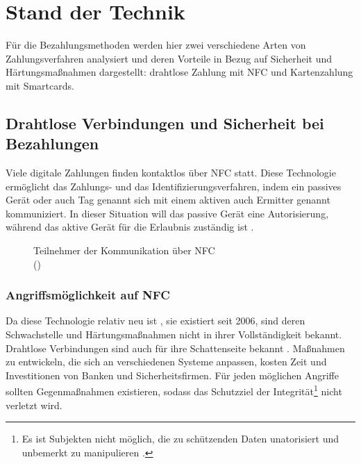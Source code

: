 \section{Stand der Technik}

Für die Bezahlungsmethoden werden hier zwei verschiedene Arten von Zahlungsverfahren analysiert und deren
Vorteile in Bezug auf Sicherheit und Härtungsmaßnahmen dargestellt: drahtlose Zahlung mit NFC und 
Kartenzahlung mit Smartcards.

\subsection{Drahtlose Verbindungen und Sicherheit bei Bezahlungen}

Viele digitale Zahlungen finden kontaktlos über NFC statt. Diese Technologie ermöglicht das Zahlungs- und
das Identifizierungsverfahren, indem ein passives Gerät oder auch Tag genannt sich mit einem aktiven 
auch Ermitter genannt kommuniziert. In dieser Situation will das passive Gerät eine Autorisierung,
während das aktive Gerät für die Erlaubnis zuständig ist \cite{refart:NFNK}. 

\begin{figure}[H]
   \caption{Teilnehmer der Kommunikation über NFC\\(\cite{refart:GPIN})}
   \label{fig:refart_GPIN}
\end{figure}


\subsubsection{Angriffsmöglichkeit auf NFC}

Da diese Technologie relativ neu ist \cite{refip:NTAS}, sie existiert seit 2006, sind deren Schwachstelle 
und Härtungsmaßnahmen nicht in ihrer Vollständigkeit bekannt. Drahtlose Verbindungen sind auch für ihre Schattenseite 
bekannt \cite{refip:NYRS}. Maßnahmen zu entwickeln, die sich an verschiedenen Systeme anpassen, kosten Zeit 
und Investitionen von Banken und Sicherheitsfirmen. Für jeden möglichen Angriffe sollten Gegenmaßnahmen existieren, 
sodass das Schutzziel der Integrität\footnote{Es ist Subjekten nicht möglich, die zu schützenden Daten unatorisiert und 
unbemerkt zu manipulieren \cite{refbook:SWIS}.} nicht verletzt wird.

